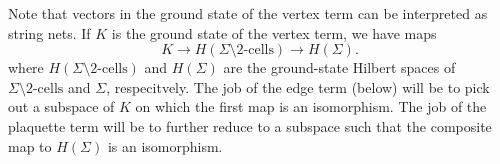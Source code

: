 \documentclass[12pt,a4paper]{article}
\newcommand{\tp}{\otimes}
\newcommand{\unit}{\mathds{1}}
\newcommand{\mch}{\mathcal{H}}
\newcommand\be            {\begin{equation}}
\newcommand\ee            {\end{equation}}
\newcommand{\kw}[1]{{\color{kwcolor}\footnotesize{(KW) #1}}}
\newcommand{\ket}[1]{\ensuremath{\left|#1\right\rangle}}
\newcommand{\ethan}[1]{{\color{amethyst}\footnotesize{(EL) #1}}}
\begin{document}
Note that vectors in the ground state of the vertex term can be interpreted as string nets.
If $K$ is the ground state of the vertex term, we have maps
\be
	K \to H(\Sigma \setminus \mbox{2-cells}) \to H(\Sigma) .
\ee
where $H(\Sigma \setminus \mbox{2-cells})$ and $H(\Sigma)$ are the ground-state Hilbert spaces of $\Sigma \setminus \mbox{2-cells}$ and $\Sigma$, respecitvely.
The job of the edge term (below) will be to pick out a subspace of $K$ on which the first map is an isomorphism. 
The job of the plaquette term will be to further reduce to a subspace such that the composite map to $H(\Sigma)$ is an isomorphism.

\end{document}
